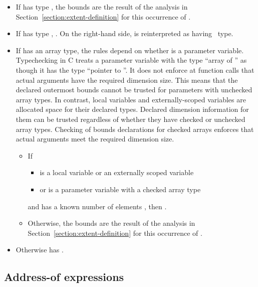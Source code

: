 \begin{itemize}
\item
  If  has type \arrayptr, the bounds are the result of
  the analysis in Section~\ref{section:extent-definition}
  for this occurrence of .
\item
  If  has type \ptrT, 
  .
   On the right-hand side,  is reinterpreted as having \arrayptr\ type.
\item
  If  has an array type, the rules depend on whether   is a parameter
  variable.  Typechecking in C treats a parameter variable with the type ``array of ''
   as though it has the type ``pointer to ''.   It does not enforce 
  at function calls that actual arguments have the required dimension size.  This means
  that the declared outermost bounds cannot be trusted for parameters with unchecked
  array types.  In contrast, local variables and externally-scoped variables are allocated 
  space for their declared types.  Declared dimension information for them can be trusted 
  regardless of whether they have checked or unchecked array types.  Checking of bounds 
  declarations for checked arrays  enforces that actual arguments meet the required
  dimension size.
\begin{itemize}
\item If 
\begin{itemize} 
\item {} is a local variable or an externally scoped variable 
\item or  is a parameter variable with a checked array type
\end{itemize}
and  has a known number of elements , then  
  .
\item Otherwise, the bounds are the result of the analysis in 
  Section~\ref{section:extent-definition} for this occurrence of .
\end{itemize}
\item  Otherwise  has \boundsunknown.
\end{itemize}

\subsection{Address-of expressions}
\label{section:address-of-expression-bounds}

